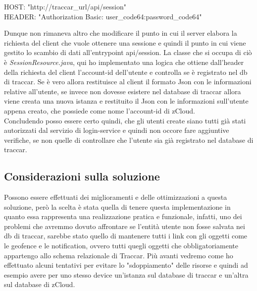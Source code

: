 \documentclass[a4paper,titlepage,12pt]{book}
\begin{document}
\begin{center}\begin{flushleft}
HOST: "http://traccar\_url/api/session"\\
HEADER: "Authorization Basic: user\_code64:password\_code64"\par\medskip
\end{flushleft}

\end{center}

Dunque non rimaneva altro che modificare il punto in cui il server elabora la richiesta del client che vuole ottenere una sessione e quindi il punto in cui viene gestito lo scambio di dati all'entrypoint api/session. La classe che si occupa di ciò è \textit{SessionResource.java}, qui ho implementato una logica che ottiene dall'header della richiesta del client l'account-id dell'utente e controlla se è registrato nel db di traccar. Se è vero allora restituisce al client il formato Json con le informazioni relative all'utente, se invece non dovesse esistere nel database di traccar allora viene creata una nuova istanza e restituito il Json con le informazioni sull'utente appena creato, che possiede come nome l'account-id di zCloud.\\
Concludendo posso essere certo quindi, che gli utenti create siano tutti già stati autorizzati dal servizio di login-service e quindi non occore fare aggiuntive verifiche, se non quelle di controllare che l'utente sia già registrato nel database di traccar.

\subsection{\sffamily
Considerazioni sulla soluzione}
Possono essere effettuati dei miglioramenti e delle ottimizzazioni a questa soluzione, però la scelta è stata quella di tenere questa implementazione in quanto essa rappresenta una realizzazione pratica e funzionale, infatti, uno dei problemi che avremmo dovuto affrontare se l'entità utente non fosse salvata nei db di traccar, sarebbe stato quello di mantenere tutti i link con gli oggetti come le geofence e le notification, ovvero tutti quegli oggetti che obbligatoriamente appartengo allo schema relazionale di Traccar. Più avanti vedremo come ho effettuato alcuni tentativi per evitare lo "sdoppiamento" delle risorse e quindi ad esempio avere per uno stesso device un'istanza sul database di traccar e un'altra sul database di zCloud.
\end{document}

